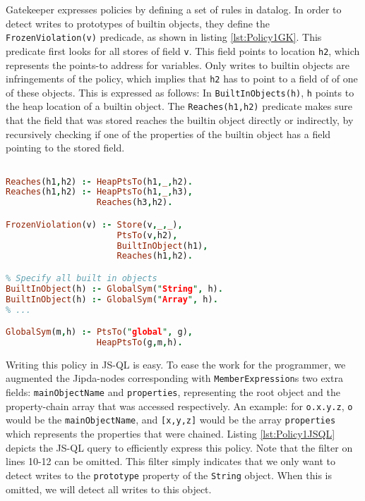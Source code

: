 Gatekeeper expresses policies by defining a set of rules in datalog. In order to detect writes to prototypes of builtin objects, they define the \texttt{FrozenViolation(v)} predicade, as shown in listing \ref{lst:Policy1GK}. This predicate first looks for all stores of field \texttt{v}. This field points to location \texttt{h2}, which represents the points-to address for variables. Only writes to builtin objects are infringements of the policy, which implies that \texttt{h2} has to point to a field of of one of these objects. This is expressed as follows: In \texttt{BuiltInObjects(h)}, \texttt{h} points to the heap location of a builtin object. The \texttt{Reaches(h1,h2)} predicate makes sure that the field that was stored reaches the builtin object directly or indirectly, by recursively checking if one of the properties of the builtin object has a field pointing to the stored field.

\begin{lstlisting}[label={lst:Policy1GK},language=Prolog,caption=Policy 1 in GateKeeper,mathescape=true]  % float=t?

Reaches(h1,h2) :- HeapPtsTo(h1,_,h2).
Reaches(h1,h2) :- HeapPtsTo(h1,_,h3),
                  Reaches(h3,h2).

FrozenViolation(v) :- Store(v,_,_),
                      PtsTo(v,h2),
                      BuiltInObject(h1),
                      Reaches(h1,h2).

% Specify all built in objects
BuiltInObject(h) :- GlobalSym("String", h).
BuiltInObject(h) :- GlobalSym("Array", h).
% ...

GlobalSym(m,h) :- PtsTo("global", g),
                  HeapPtsTo(g,m,h).

\end{lstlisting}

Writing this policy in JS-QL is easy. To ease the work for the programmer, we augmented the Jipda-nodes corresponding with \texttt{MemberExpression}s two extra fields: \texttt{mainObjectName} and \texttt{properties}, representing the root object and the property-chain array that was accessed respectively. An example: for \texttt{o.x.y.z}, \texttt{o} would be the \texttt{mainObjectName}, and \texttt{[x,y,z]} would be the array \texttt{properties} which represents the properties that were chained. Listing \ref{lst:Policy1JSQL} depicts the JS-QL query to efficiently express this policy. Note that the filter on lines 10-12 can be omitted. This filter simply indicates that we only want to detect writes to the \texttt{prototype} property of the \texttt{String} object. When this is omitted, we will detect all writes to this object.

